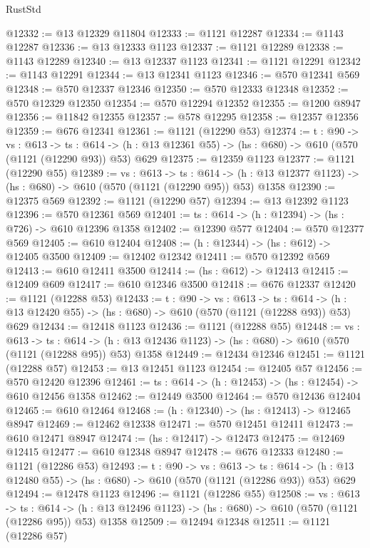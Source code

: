 \begin{lexlean}{RustStd}
\begin{coremodule}
@12332 := @13 @12329 @11804
@12333 := @1121 @12287
@12334 := @1143 @12287
@12336 := @13 @12333 @1123
@12337 := @1121 @12289
@12338 := @1143 @12289
@12340 := @13 @12337 @1123
@12341 := @1121 @12291
@12342 := @1143 @12291
@12344 := @13 @12341 @1123
@12346 := @570 @12341 @569
@12348 := @570 @12337 @12346
@12350 := @570 @12333 @12348
@12352 := @570 @12329 @12350
@12354 := @570 @12294 @12352
@12355 := @1200 @8947
@12356 := @11842 @12355
@12357 := @578 @12295
@12358 := @12357 @12356
@12359 := @676 @12341
@12361 := @1121 (@12290 @53)
@12374 := {t : @90} ->
  {vs : @613} ->
  {ts : @614} -> (h : @13 @12361 @55) -> (hs : @680) -> @610 (@570 (@1121 (@12290 @93)) @53) @629
@12375 := @12359 @1123
@12377 := @1121 (@12290 @55)
@12389 := {vs : @613} ->
  {ts : @614} -> (h : @13 @12377 @1123) -> (hs : @680) -> @610 (@570 (@1121 (@12290 @95)) @53) @1358
@12390 := @12375 @569
@12392 := @1121 (@12290 @57)
@12394 := @13 @12392 @1123
@12396 := @570 @12361 @569
@12401 := {ts : @614} -> (h : @12394) -> (hs : @726) -> @610 @12396 @1358
@12402 := @12390 @577
@12404 := @570 @12377 @569
@12405 := @610 @12404
@12408 := (h : @12344) -> (hs : @612) -> @12405 @3500
@12409 := @12402 @12342
@12411 := @570 @12392 @569
@12413 := @610 @12411 @3500
@12414 := (hs : @612) -> @12413
@12415 := @12409 @609
@12417 := @610 @12346 @3500
@12418 := @676 @12337
@12420 := @1121 (@12288 @53)
@12433 := {t : @90} ->
  {vs : @613} ->
  {ts : @614} -> (h : @13 @12420 @55) -> (hs : @680) -> @610 (@570 (@1121 (@12288 @93)) @53) @629
@12434 := @12418 @1123
@12436 := @1121 (@12288 @55)
@12448 := {vs : @613} ->
  {ts : @614} -> (h : @13 @12436 @1123) -> (hs : @680) -> @610 (@570 (@1121 (@12288 @95)) @53) @1358
@12449 := @12434 @12346
@12451 := @1121 (@12288 @57)
@12453 := @13 @12451 @1123
@12454 := @12405 @57
@12456 := @570 @12420 @12396
@12461 := {ts : @614} -> (h : @12453) -> (hs : @12454) -> @610 @12456 @1358
@12462 := @12449 @3500
@12464 := @570 @12436 @12404
@12465 := @610 @12464
@12468 := (h : @12340) -> (hs : @12413) -> @12465 @8947
@12469 := @12462 @12338
@12471 := @570 @12451 @12411
@12473 := @610 @12471 @8947
@12474 := (hs : @12417) -> @12473
@12475 := @12469 @12415
@12477 := @610 @12348 @8947
@12478 := @676 @12333
@12480 := @1121 (@12286 @53)
@12493 := {t : @90} ->
  {vs : @613} ->
  {ts : @614} -> (h : @13 @12480 @55) -> (hs : @680) -> @610 (@570 (@1121 (@12286 @93)) @53) @629
@12494 := @12478 @1123
@12496 := @1121 (@12286 @55)
@12508 := {vs : @613} ->
  {ts : @614} -> (h : @13 @12496 @1123) -> (hs : @680) -> @610 (@570 (@1121 (@12286 @95)) @53) @1358
@12509 := @12494 @12348
@12511 := @1121 (@12286 @57)

\end{coremodule}
\end{lexlean}
